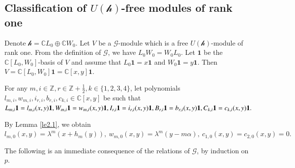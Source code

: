 \documentclass[12pt,reqno]{amsart}
\def\Z{\mathbb{Z}}
\def\C{\mathbb{C}}
\numberwithin{equation}{section}
\begin{document}
    










































\subsection{\texorpdfstring{Classification of $U(\mathcal{h})$-free modules of rank one}{Classification of U(CL0 CW0)-free modules of rank 1}}
Denote $\mathcal{h}=\C L_0\oplus \C W_0
$.
Let $V$ be a $\mathcal{G}$-module which is a free $U(\mathcal{h})$-module of rank one. From the definition of $\mathcal{G}$, we have $L_{0}W_{0}=W_{0}L_{0}$. Let $\mathbf{1}$ be the $\C[L_{0},W_{0}]$-basis of $V$ and assume that $L_{0}\mathbf{1}=x\mathbf{1}$ and $W_{0}\mathbf{1}=y\mathbf{1}$. Then $V=\C[L_{0},W_{0}]\mathbf{1}=\C[x,y]\mathbf{1}$. 





For any $m,i\in\Z, r\in\Z+\frac{1}{2}, k\in \{1,2,3,4\}$, let polynomials $l_{m,i},w_{m,i},i_{r,i},b_{r,i}, c_{k,i}\in \C[x,y]$ be such that $L_{m,i}\mathbf{1}=l_{m,i}(x,y)\mathbf{1},W_{m,i}\mathbf{1}=w_{m,i}(x,y)\mathbf{1},I_{r,i}\mathbf{1}=i_{r,i}(x,y)\mathbf{1},
B_{r,i}\mathbf{1}=b_{r,i}(x,y)\mathbf{1},
\linebreak C_{k,i}\mathbf{1}=c_{k,i}(x,y)\mathbf{1}.$

By Lemma \ref{le2.1}, we obtain $l_{m,0}(x,y)=\lambda^m(x+h_{m}(y)),\ w_{m,0}(x,y)=\lambda^m(y-m\alpha),\ c_{1,0}(x,y)=c_{2,0}(x,y)=0.$

The following is an immediate consequence of the relations of $\mathcal{G}$, by induction on $p$.
\end{document}
